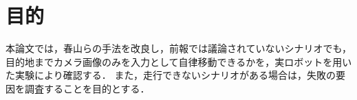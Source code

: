 \section{目的}
本論文では，春山らの手法を改良し，前報では議論されていないシナリオでも，目的地までカメラ画像のみを入力として自律移動できるかを，実ロボットを用いた実験により確認する．
また，走行できないシナリオがある場合は，失敗の要因を調査することを目的とする．